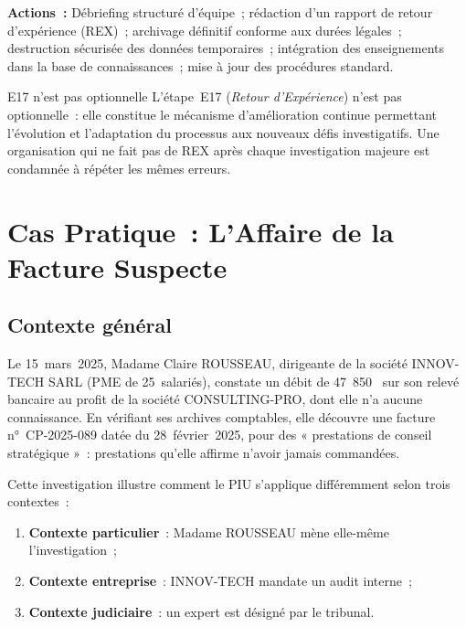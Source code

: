 \textbf{Actions~:} Débriefing structuré d'équipe~;
rédaction d'un rapport de retour d'expérience (REX)~;
archivage définitif conforme aux durées légales~;
destruction sécurisée des données temporaires~;
intégration des enseignements dans la base de connaissances~;
mise à jour des procédures standard.

\begin{boiteRemarque}{E17 n'est pas optionnelle}
L'étape~E17 (\textit{Retour d'Expérience}) n'est pas optionnelle~: elle
constitue le mécanisme d'amélioration continue permettant l'évolution et
l'adaptation du processus aux nouveaux défis investigatifs. Une organisation
qui ne fait pas de REX après chaque investigation majeure est condamnée à
répéter les mêmes erreurs.
\end{boiteRemarque}

\section{Cas Pratique~: L'Affaire de la Facture Suspecte}
\label{sec:piu-rousseau}

\subsection{Contexte général}

Le 15~mars~2025, Madame Claire ROUSSEAU, dirigeante de la société INNOV-TECH
SARL (PME de 25~salariés), constate un débit de 47~850~\texteuro{} sur son relevé
bancaire au profit de la société CONSULTING-PRO, dont elle n'a aucune
connaissance. En vérifiant ses archives comptables, elle découvre une facture
n°~CP-2025-089 datée du 28~février~2025, pour des « prestations de conseil
stratégique »~: prestations qu'elle affirme n'avoir jamais commandées.

Cette investigation illustre comment le PIU s'applique différemment selon trois
contextes~:
\begin{enumerate}
    \item \textbf{Contexte particulier}~: Madame ROUSSEAU mène elle-même
          l'investigation~;
    \item \textbf{Contexte entreprise}~: INNOV-TECH mandate un audit interne~;
    \item \textbf{Contexte judiciaire}~: un expert est désigné par le tribunal.
\end{enumerate}

